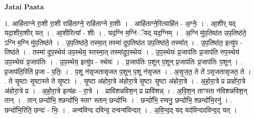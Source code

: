 \documentclass[17pt]{extarticle}
\begin{document}
\textbf{Jatai Paata} \newline

1. आहि॑ताग्ने रा॒शी रा॒शी राहि॑ताग्ने॒ राहि॑ताग्ने रा॒शीः । . आहि॑ताग्ने॒रित्याहि॑त - अ॒ग्नेः॒ । . आ॒शीर् यद् यदा॒शीरा॒शीर् यत् । . आ॒शीरित्या᳚ - शीः । . यद॒ग्नि म॒ग्निं ॅयद् यद॒ग्निम् । . अ॒ग्नि मु॑प॒तिष्ठ॑त उप॒तिष्ठ॑ते॒ ऽग्नि म॒ग्नि मु॑प॒तिष्ठ॑ते । . उ॒प॒तिष्ठ॑ते॒ तस्मा॒त् तस्मा॑ दुप॒तिष्ठ॑त उप॒तिष्ठ॑ते॒ तस्मा᳚त् । . उ॒प॒तिष्ठ॑त॒ इत्यु॑प - तिष्ठ॑ते । . तस्मा॑ दुप॒स्थेय॑ उप॒स्थेय॒ स्तस्मा॒त् तस्मा॑दुप॒स्थेयः॑ । . उ॒प॒स्थेयः॑ प्र॒जाप॑तिः प्र॒जाप॑ति रुप॒स्थेय॑ उप॒स्थेयः॑ प्र॒जाप॑तिः । . उ॒प॒स्थेय॒ इत्यु॑प - स्थेयः॑ । . प्र॒जाप॑तिः प॒शून् प॒शून् प्र॒जाप॑तिः प्र॒जाप॑तिः प॒शून् । . प्र॒जाप॑ति॒रिति॑ प्र॒जा - प॒तिः॒ । . प॒शू न॑सृजतासृजत प॒शून् प॒शू न॑सृजत । . अ॒सृ॒ज॒त॒ ते ते॑ ऽसृजतासृजत॒ ते । . ते सृ॒ष्टाः सृ॒ष्टास्ते ते सृ॒ष्टाः । . सृ॒ष्टा अ॑होरा॒त्रे अ॑होरा॒त्रे सृ॒ष्टाः सृ॒ष्टा अ॑होरा॒त्रे । . अ॒हो॒रा॒त्रे प्र प्राहो॑रा॒त्रे अ॑होरा॒त्रे प्र । . अ॒हो॒रा॒त्रे इत्य॑हः - रा॒त्रे । . प्रावि॑शन्नविश॒न् प्र प्रावि॑शन्न् । . अ॒वि॒श॒न् ताꣳस्ता न॑विशन्नविश॒न् तान् । . तान् छन्दो॑भि॒ श्छन्दो॑भि॒ स्ताꣳ स्तान् छन्दो॑भिः । . छन्दो॑भि॒ रन्वनु॒ छन्दो॑भि॒ श्छन्दो॑भि॒रनु॑ । . छन्दो॑भि॒रिति॒ छन्दः॑ - भिः॒ । . अन्व॑विन्द दविन्द॒ दन्वन्व॑विन्दत् । . अ॒वि॒न्द॒द् यद् यद॑विन्ददविन्द॒द् यत् । \newline
\end{document}
